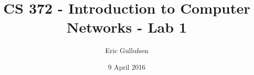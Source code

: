 \documentclass[12pt]{article}
\begin{document}
\title{CS 372 - Introduction to Computer Networks - Lab 1}
\author{Eric Gullufsen}
\date{9 April 2016}
\maketitle

\end{document}
